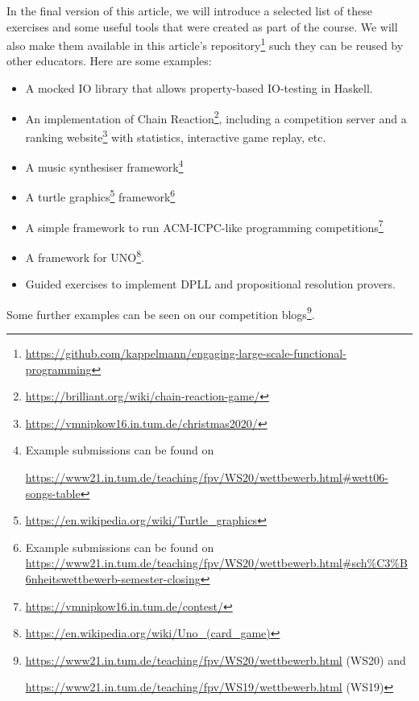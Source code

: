 In the final version of this article,
we will introduce a selected list of
these exercises and some useful tools
that were created as part of the course.
We will also make them available in this article's repository\footnote{\url{https://github.com/kappelmann/engaging-large-scale-functional-programming}}
such they can be reused by other educators.
Here are some examples:
\begin{itemize}
\item A mocked IO library that allows property-based IO-testing in Haskell.
\item An implementation of Chain Reaction\footnote{\url{ https://brilliant.org/wiki/chain-reaction-game/}},
including a competition server
and a ranking website\footnote{\url{https://vmnipkow16.in.tum.de/christmas2020/}} with statistics,
interactive game replay, etc.
\item A music synthesiser framework\footnote{Example submissions can be found on

\url{https://www21.in.tum.de/teaching/fpv/WS20/wettbewerb.html\#wett06-songs-table}}
\item A turtle graphics\footnote{\url{https://en.wikipedia.org/wiki/Turtle_graphics}} framework\footnote{Example submissions can be found on
\url{https://www21.in.tum.de/teaching/fpv/WS20/wettbewerb.html\#sch\%C3\%B6nheitswettbewerb-semester-closing}}
\item A simple framework to run ACM-ICPC-like programming competitions\footnote{\url{https://vmnipkow16.in.tum.de/contest/}}
\item A framework for UNO\footnote{\url{https://en.wikipedia.org/wiki/Uno_(card_game)}}.
\item Guided exercises to implement DPLL and propositional resolution provers.
\end{itemize}
Some further examples can be seen on our competition blogs\footnote{\url{https://www21.in.tum.de/teaching/fpv/WS20/wettbewerb.html} (WS20) and

\url{https://www21.in.tum.de/teaching/fpv/WS19/wettbewerb.html} (WS19)}.



